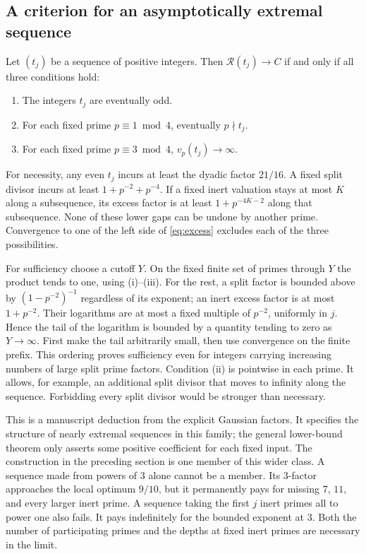 \documentclass[12pt,letterpaper]{article}
\begin{document}
\subsection{A criterion for an asymptotically extremal sequence}
Let $(t_j)$ be a sequence of positive integers. Then $\mathcal R(t_j)\to C$ if and only if all three conditions hold:
\begin{enumerate}[label=(\roman*)]
\item The integers $t_j$ are eventually odd.
\item For each fixed prime $p\equiv1\bmod4$, eventually $p\nmid t_j$.
\item For each fixed prime $p\equiv3\bmod4$, $v_p(t_j)\to\infty$.
\end{enumerate}
For necessity, any even $t_j$ incurs at least the dyadic factor $21/16$. A fixed split divisor incurs at least $1+p^{-2}+p^{-4}$. If a fixed inert valuation stays at most $K$ along a subsequence, its excess factor is at least $1+p^{-4K-2}$ along that subsequence. None of these lower gaps can be undone by another prime. Convergence to one of the left side of \eqref{eq:excess} excludes each of the three possibilities.

For sufficiency choose a cutoff $Y$. On the fixed finite set of primes through $Y$ the product tends to one, using (i)--(iii). For the rest, a split factor is bounded above by $(1-p^{-2})^{-1}$ regardless of its exponent; an inert excess factor is at most $1+p^{-2}$. Their logarithms are at most a fixed multiple of $p^{-2}$, uniformly in $j$. Hence the tail of the logarithm is bounded by a quantity tending to zero as $Y\to\infty$. First make the tail arbitrarily small, then use convergence on the finite prefix. This ordering proves sufficiency even for integers carrying increasing numbers of large split prime factors. Condition (ii) is pointwise in each prime. It allows, for example, an additional split divisor that moves to infinity along the sequence. Forbidding every split divisor would be stronger than necessary.

This is a manuscript deduction from the explicit Gaussian factors. It specifies the structure of nearly extremal sequences in this family; the general lower-bound theorem only asserts some positive coefficient for each fixed input. The construction in the preceding section is one member of this wider class. A sequence made from powers of $3$ alone cannot be a member. Its $3$-factor approaches the local optimum $9/10$, but it permanently pays for missing $7$, $11$, and every larger inert prime. A sequence taking the first $j$ inert primes all to power one also fails. It pays indefinitely for the bounded exponent at $3$. Both the number of participating primes and the depths at fixed inert primes are necessary in the limit.
\end{document}
